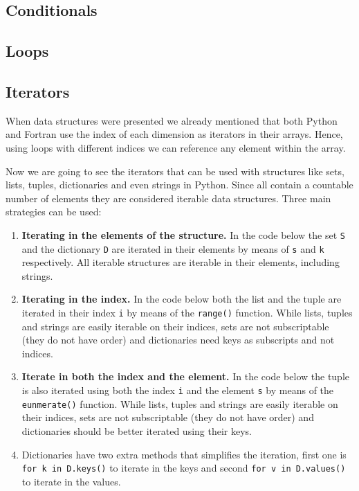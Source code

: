         \subsection*{Conditionals}
        
        
        
        \subsection*{Loops}
        
        
        
        \subsection*{Iterators}
        
        When data structures were presented we already mentioned that both Python and Fortran 
        use the index of each dimension as iterators in their arrays. 
        Hence, using loops with different indices we can reference any element within the array.
        
        Now we are going to see the iterators that can be used with structures like 
        sets, lists, tuples, dictionaries and even strings in Python.    
        Since all contain a countable number of elements they are considered iterable data structures. 
        Three main strategies can be used:
        \begin{enumerate}
            \item \textbf{Iterating in the elements of the structure.} 
            In the code below the set \texttt{S} and the dictionary \texttt{D} are iterated in their elements
            by means of \texttt{s} and \texttt{k} respectively. 
            All iterable structures are iterable in their elements, including strings.  
            \item \textbf{Iterating in the index.}
            In the code below both the list and the tuple are iterated in their index \texttt{i} by means of the \texttt{range()} function.
            While lists, tuples and strings are easily iterable on their indices, 
            sets are not subscriptable (they do not have order) and 
            dictionaries need keys as subscripts and not indices. 
            \item \textbf{Iterate in both the index and the element.} 
            In the code below the tuple is also iterated using both the index \texttt{i} and the element \texttt{s} 
            by means of the \texttt{eunmerate()} function.
            While lists, tuples and strings are easily iterable on their indices, 
            sets are not subscriptable (they do not have order) and 
            dictionaries should be better iterated using their keys.
            
            \item Dictionaries have two extra methods that simplifies the iteration, first one is 
            \texttt{for k in D.keys()} to iterate in the keys 
            and second \texttt{for v in D.values()} to iterate in the values. 
        \end{enumerate} 
        
